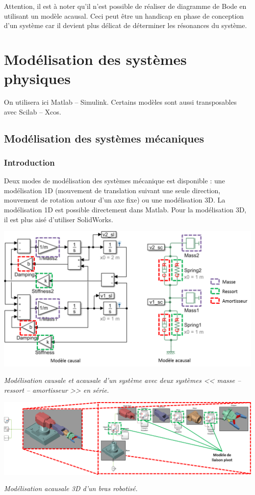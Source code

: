 \documentclass[10pt,fleqn]{article} %
\begin{document}
\begin{warn}
Attention, il est à noter qu'il n'est possible de réaliser de diagramme de Bode en utilisant un modèle acausal. Ceci peut être un handicap en phase de conception d'un système car il devient plus délicat de déterminer les résonances du système.
\end{warn}
\section{Modélisation des systèmes physiques}
On utilisera ici Matlab -- Simulink. Certains modèles sont aussi transposables avec Scilab -- Xcos. 

\subsection{Modélisation des systèmes mécaniques}
\subsubsection{Introduction}
Deux modes de modélisation des systèmes mécanique est disponible : une modélisation 1D (mouvement de translation suivant une seule direction, mouvement de rotation autour d'un axe fixe) ou une modélisation 3D. 
La modélisation 1D est possible directement dans Matlab. Pour la modélisation 3D, il est plus aisé d'utiliser SolidWorks. 

\begin{center}
\includegraphics[width=.6\linewidth]{images/Masse_Ressort}

\textit{Modélisation causale et acausale d'un système avec deux systèmes << masse -- ressort -- amortisseur >> en série.}
\end{center}

\begin{center}
\includegraphics[width=.9\linewidth]{images/Modele3D}

\textit{Modélisation acausale 3D d'un bras robotisé.}
\end{center}
\end{document}
